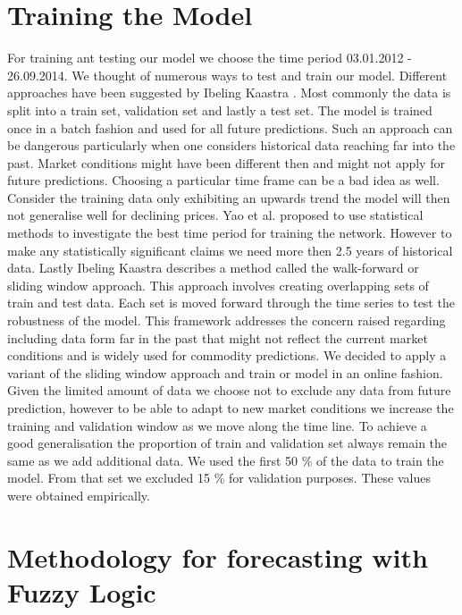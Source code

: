 \section{Training the Model}

For training ant testing our model we choose the time period 03.01.2012 - 26.09.2014. We thought of numerous ways to test and train our model. Different approaches have been suggested by Ibeling Kaastra \cite{Kaastra96designinga}. Most commonly the data is split into a train set, validation set and lastly a test set. The model is trained once in a batch fashion and used for all future predictions. Such an approach can be dangerous particularly when one considers historical data reaching far into the past. Market conditions might have been different then and might not apply for future predictions. Choosing a particular time frame can be a bad idea as well. Consider the training data only exhibiting an upwards trend the model will then not generalise well for declining prices. Yao et al. \cite{Yao00acase} proposed to use statistical methods to investigate the best time period for training the network. However to make any statistically significant claims we need more then 2.5 years of historical data. Lastly Ibeling Kaastra describes a method called the walk-forward or sliding window approach. This approach involves creating overlapping sets of train and test data. Each set is moved forward through the time series to test the robustness of the model. This framework addresses the concern raised regarding including data form far in the past that might not reflect the current market conditions and is widely used for commodity predictions. We decided to apply a variant of the sliding window approach and train or model in an online fashion. Given the limited amount of data we choose not to exclude any data from future prediction, however to be able to adapt to new market conditions we increase the training and validation window as we move along the time line. To achieve a good generalisation the proportion of train and validation set always remain the same as we add additional data. We used the first 50 \% of the data to train the model. From that set we excluded 15 \% for validation purposes. These values were obtained empirically. 



\section{Methodology for forecasting with Fuzzy Logic}


